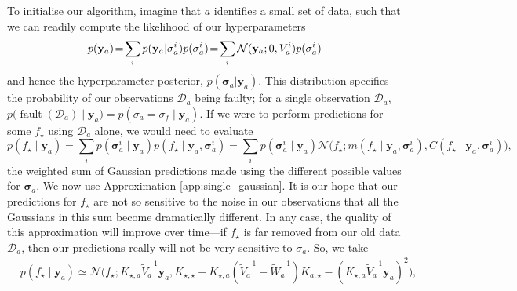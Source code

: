 \documentclass{article} %
\newcommand{\given}{\!\ensuremath{\mid}\!}
\newcommand{\cm}[1]{\ensuremath{\mathcal{#1}}}
\newcommand{\bm}[1]{\ensuremath{\mathbf{#1}}}
\newcommand{\data}{\ensuremath{\cm{D}}}
\newcommand{\vect}[1]{\bm{#1}}
\newcommand{\vy}{\vect{y}}
\newcommand{\vs}{\vect{\sigma}}
\newcommand{\amean}[2]{\tilde{{m}}(#1 \given #2 )}
\newcommand{\acov}[2]{\tilde{{C}}(#1 \given #2 )}
\newcommand{\p}[2]{p(#1\given#2)}
\newcommand{\fPr}{p}
\newcommand{\Prob}[2]{\fPr(#1 \given #2 )}
\newcommand{\ps}[2]{p(#1\vert#2)}
\newcommand{\mean}[2]{{m}(#1\given#2)}
\newcommand{\cov}[2]{{C}(#1\given#2)}
\newcommand{\N}[3]{\cm{N}( #1;#2,#3 )}
\newcommand{\st}{_{\star}}
\newcommand{\defequal}{=}
\DeclareMathOperator{\fault}{fault}
\begin{document}
To initialise our algorithm, imagine that $a$ identifies a small set
of data, such that we can readily compute the likelihood of our hyperparameters
\begin{equation}
 \hspace{-0.0cm}p(\vy_a)\!=\!\sum_i  \ps{\vy_a}{\vs^i_a}\fPr(\vs^i_a)
\!=\! \sum_i \N{\vy_a}{0}{V_a^i}\fPr(\vs_a^i) \label{eq:likelihood_a}
\end{equation}
and hence the hyperparameter posterior, $\ps{\vs_a}{\vy_{a}}$.
This distribution specifies the probability of our observations
$\data_a$ being faulty; for a single observation $\data_a$,
$
p\bigl(\fault(\data_a) \given \vy_{a}\bigr) = \Prob{\sigma_a = \sigma_f}{\vy_{a}}
$.
If we were to perform predictions for some $f\st$ using $\data_a$
alone, we would need to evaluate
\begin{equation*}
\p{f\st}{\vy_{a}} = \sum_{i} \Prob{\vs^i_{a}}{\vy_a} \p{f\st}{\vy_a, \vs^{i}_{a}}
=\sum_{i} \Prob{\vs^i_{a}}{\vy_a} \cm{N}\bigl(f\st; \mean{f\st}{\vy_a, \vs^{i}_{a}}, \cov{f\st}{\vy_a, \vs^{i}_{a}}\bigr),
\end{equation*}
the weighted sum of Gaussian predictions made using the different
possible values for $\vs_{a}$.  We now use Approximation \ref{app:single_gaussian}. It is our hope that our predictions
for $f\st$ are not so sensitive to the noise in our observations that
all the Gaussians in this sum become dramatically different. In any
case, the quality of this approximation will improve over time---if
$f\st$ is far removed from our old data $\data_a$, then our
predictions really will not be very sensitive to $\sigma_a$. So, we take
\begin{align*}
 &\p{f\st}{\vy_{a}} \simeq \cm{N}\bigl(f\st; K_{\star,a} \tilde{V}_a^{-1} \vy_a, K_{\star,\star} - K_{\star,a}(\tilde{V}_a^{-1}-\tilde{W}_a^{-1})K_{a,\star} 
 - (K_{\star,a} \tilde{V}_a^{-1}\vy_a)^2\bigr),%
\end{align*}
\end{document}
